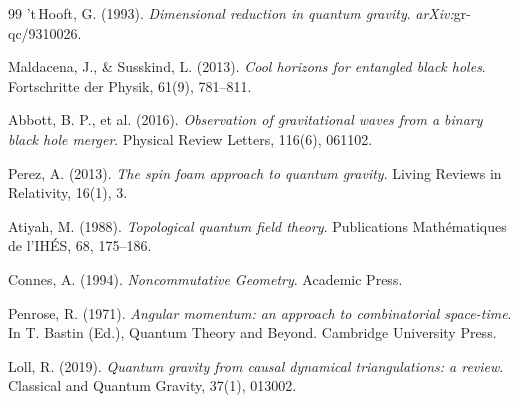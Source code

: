 ﻿\documentclass[a4paper,12pt]{article}
\theoremstyle{definition}
\begin{document}
\begin{thebibliography}{99}
't\,Hooft, G. (1993).
\textit{Dimensional reduction in quantum gravity}.
\textit{arXiv:}gr-qc/9310026.

Maldacena, J., \& Susskind, L. (2013).
\textit{Cool horizons for entangled black holes}.
Fortschritte der Physik, 61(9), 781--811.

Abbott, B. P., et al. (2016).
\textit{Observation of gravitational waves from a binary black hole merger}.
Physical Review Letters, 116(6), 061102.

Perez, A. (2013).
\textit{The spin foam approach to quantum gravity}.
Living Reviews in Relativity, 16(1), 3.

Atiyah, M. (1988).
\textit{Topological quantum field theory}.
Publications Math\'ematiques de l'IH\'ES, 68, 175--186.

Connes, A. (1994).
\textit{Noncommutative Geometry}.
Academic Press.

Penrose, R. (1971).
\textit{Angular momentum: an approach to combinatorial space-time}.
In T. Bastin (Ed.), Quantum Theory and Beyond. Cambridge University Press.

Loll, R. (2019).
\textit{Quantum gravity from causal dynamical triangulations: a review}.
Classical and Quantum Gravity, 37(1), 013002.

\end{thebibliography}
\end{document}
